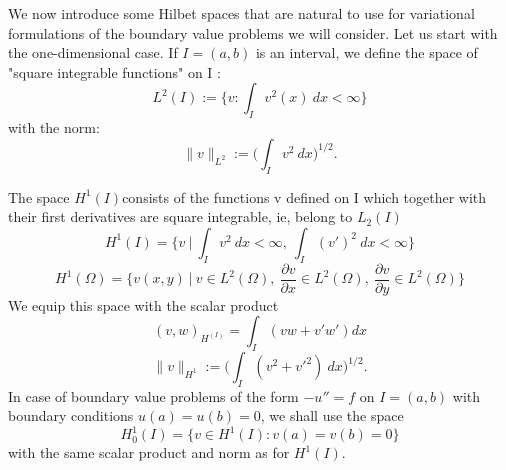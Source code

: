 We now introduce some Hilbet spaces that are natural to use for variational formulations of the boundary value problems we will consider. Let us start with the one-dimensional case. If $I = (a,b)$ is an interval, we define the space of "square integrable functions" on I :
\begin{equation}
L^2(I) := \bigg\{ v:  \int_{I} v^2(x) \ dx < \infty\bigg\}
\end{equation}
with the norm:
\begin{equation}
\lVert v \rVert_{L^2} := \bigg( \int_{I} v^2 \ dx \bigg)^{1/2}.
\end{equation}

The space $H^1(I)$consists of the functions v defined on I which together with their first derivatives are square integrable, ie, belong to $L_2 (I)$
\begin{equation}
H^1(I) = \Big\{ v \ \Big| \ \int_{I} v^2 \ dx < \infty, \ \int_{I} (v')^2 \ dx < \infty \Big\}
\end{equation}
\begin{equation}
H^1(\Omega) = \Big\{ v(x,y) \ \Big| \ v \in L^2(\Omega), \ \frac{\partial v}{\partial x} \in L^2(\Omega), \ \frac{\partial v}{\partial y} \in L^2(\Omega) \Big\}
\end{equation}
We equip this space with the scalar product 
\begin{equation}
(v,w)_{H^(I)} = \int_{I} (vw + v'w')dx
\end{equation}
\begin{equation}
\lVert v \rVert_{H^1} := \bigg( \int_{I} (v^2 + v'^2) \ dx \bigg)^{1/2}.
\end{equation}
In case of boundary value problems of the form  $ -u'' = f$ on $ I = (a,b)$ with boundary conditions $u(a) = u(b) = 0$, we shall use the space
\begin{equation}
H^1 _0(I) = \Big\{ v \in H^1(I): v(a)=v(b)=0\}
\end{equation}
with the same scalar product and norm as for $H^1(I)$.
